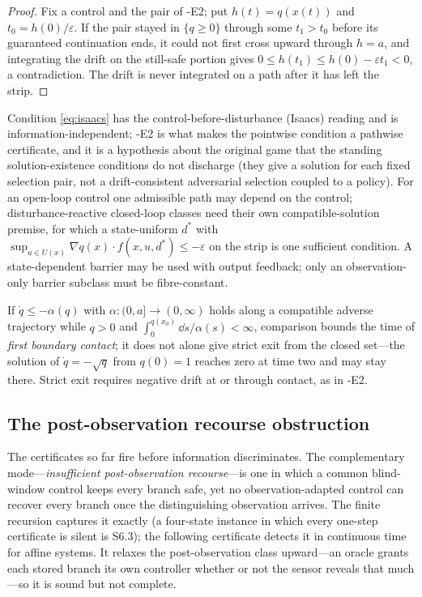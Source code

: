 \begin{proof}
Fix a control and the pair of \hyp{E2}; put $h(t)=q(x(t))$ and $t_0=h(0)/\varepsilon$. If the pair stayed in $\{q\ge0\}$ through some $t_1>t_0$ before its guaranteed continuation ends, it could not first cross upward through $h=a$, and integrating the drift on the still-safe portion gives $0\le h(t_1)\le h(0)-\varepsilon t_1<0$, a contradiction. The drift is never integrated on a path after it has left the strip.
\end{proof}

Condition \eqref{eq:isaacs} has the control-before-disturbance (Isaacs) reading and is information-independent; \hyp{E2} is what makes the pointwise condition a pathwise certificate, and it is a hypothesis about the original game that the standing solution-existence conditions do not discharge (they give a solution for each fixed selection pair, not a drift-consistent adversarial selection coupled to a policy). For an open-loop control one admissible path may depend on the control; disturbance-reactive closed-loop classes need their own compatible-solution premise, for which a state-uniform $d^*$ with $\sup_{u\in U(x)}\nabla q(x)\cdot f(x,u,d^*)\le-\varepsilon$ on the strip is one sufficient condition. A state-dependent barrier may be used with output feedback; only an observation-only barrier subclass must be fibre-constant.

\begin{remark}\label{rem:comparison}
If $\dot q\le-\alpha(q)$ with $\alpha:(0,a]\to(0,\infty)$ holds along a compatible adverse trajectory while $q>0$ and $\int_0^{q(x_0)}\dd s/\alpha(s)<\infty$, comparison bounds the time of \emph{first boundary contact}; it does not alone give strict exit from the closed set---the solution of $\dot q=-\sqrt q$ from $q(0)=1$ reaches zero at time two and may stay there. Strict exit requires negative drift at or through contact, as in \hyp{E2}.
\end{remark}

\subsection{The post-observation recourse obstruction}\label{sec:recourse}

The certificates so far fire before information discriminates. The complementary mode---\emph{insufficient post-observation recourse}---is one in which a common blind-window control keeps every branch safe, yet no observation-adapted control can recover every branch once the distinguishing observation arrives. The finite recursion captures it exactly (a four-state instance in which every one-step certificate is silent is S6.3); the following certificate detects it in continuous time for affine systems. It relaxes the post-observation class upward---an oracle grants each stored branch its own controller whether or not the sensor reveals that much---so it is sound but not complete.

